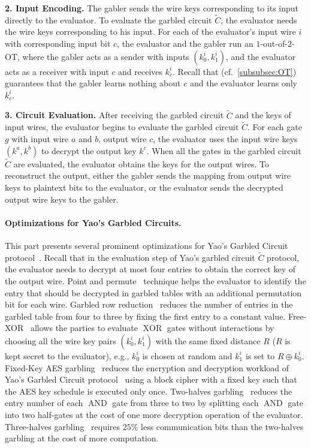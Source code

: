 \textbf{2. Input Encoding.}
The gabler sends the wire keys corresponding to its input directly to the evaluator. To evaluate the garbled circuit $\widetilde{C}$, the evaluator needs the wire keys corresponding to his input. For each of the evaluator's input wire $i$ with corresponding input bit $c$, the evaluator and the gabler run an $1$-out-of-$2$-OT, where the gabler acts as a sender with inputs $\left(k_0^i,k_1^i\right)$, and the evaluator acts as a receiver with input $c$ and receives $k_c^i$. Recall that \ot (cf.~\autoref{subsubsec:OT}) guarantees that the gabler learns nothing about $c$ and the evaluator learns only $k_{c}^i$.

\textbf{3. Circuit Evaluation.}
After receiving the garbled circuit $\widetilde{C}$ and the keys of input wires, the evaluator begins to evaluate the garbled circuit $\widetilde{C}$. For each gate $g$ with input wire $a$ and $b$, output wire $c$, the evaluator uses the input wire keys $\left(k^a,k^b\right)$ to decrypt the output key $k^c$. When all the gates in the garbled circuit $\widetilde{C}$ are evaluated, the evaluator obtains the keys for the output wires. To reconstruct the output, either the gabler sends the mapping from output wire keys to plaintext bits to the evaluator, or the evaluator sends the decrypted output wire keys to the gabler.


\paragraph{Optimizations for Yao's Garbled Circuits.}
\label{para:OptimizationsforYaosGarbledCircuits}
This part presents several prominent optimizations for Yao's Garbled Circuit protocol~\cite{yao1986generate}.
Recall that in the evaluation step of Yao's garbled circuit $\widetilde{C}$ protocol, the evaluator needs to decrypt at most four entries to obtain the correct key of the output wire. Point and permute~\cite{beaver1990round} technique helps the evaluator to identify the entry that should be decrypted in garbled tables with an additional permutation bit for each wire.
Garbled row reduction~\cite{naor1999privacy} reduces the number of entries in the garbled table from four to three by fixing the first entry to a constant value.
Free-XOR~\cite{kolesnikov2008improved} allows the parties to evaluate $\operatorname{XOR}$ gates without interactions by choosing all the wire key pairs $\left(k_0^i,k_1^i\right)$ with the same fixed distance $R$ ($R$ is kept secret to the evaluator), e.g., $k_0^i$ is chosen at random and $ k_1^i $ is set to $R\oplus k_0^i $.
Fixed-Key AES garbling~\cite{bellare2013efficient} reduces the encryption and decryption workload of Yao's Garbled Circuit protocol~\cite{yao1986generate} using a block cipher with a fixed key such that the AES key schedule is executed only once.
Two-halves garbling~\cite{zahur2015two} reduces the entry number of each $\operatorname{AND}$ gate from three to two by splitting each $\operatorname{AND}$ gate into two half-gates at the cost of one more decryption operation of the evaluator.
Three-halves garbling~\cite{rosulek2021three} requires $25\%$ less communication bits than the two-halves garbling at the cost of more computation.

